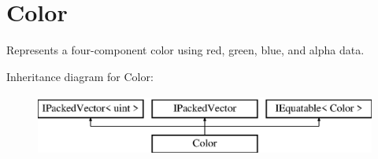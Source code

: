 \hypertarget{structMicrosoft_1_1Xna_1_1Framework_1_1Color}{}\section{Color}
\label{structMicrosoft_1_1Xna_1_1Framework_1_1Color}


Represents a four-\/component color using red, green, blue, and alpha data. 


Inheritance diagram for Color\+:\begin{figure}[H]
\begin{center}
\leavevmode
\includegraphics[height=2.000000cm]{structMicrosoft_1_1Xna_1_1Framework_1_1Color}
\end{center}
\end{figure}
